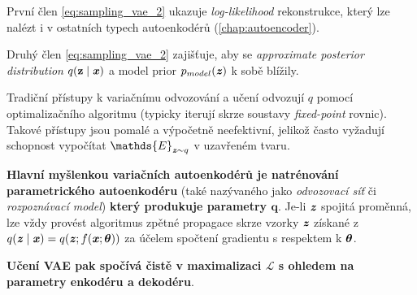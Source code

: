 První člen \autoref{eq:sampling_vae_2} ukazuje \emph{log-likelihood} rekonstrukce, který lze nalézt i v ostatních typech autoenkodérů (\autoref{chap:autoencoder}). 

Druhý člen \autoref{eq:sampling_vae_2} zajišťuje, aby se \emph{approximate posterior distribution} $q(\textbf{z}\mid\textbf{\emph{x}})$ a model prior $p_{model}(\textbf{\emph{z}})$ k sobě blížily. \cite{Goodfellow2016}

Tradiční přístupy k variačnímu odvozování a učení odvozují $q$ pomocí optimalizačního algoritmu (typicky iterují skrze soustavy \emph{fixed-point} rovnic).
Takové přístupy jsou pomalé a výpočetně neefektivní, jelikož často vyžadují schopnost vypočítat $\mathds{E}_{\textbf{\emph{z}} \sim q}$ v uzavřeném tvaru. 

\textbf{Hlavní myšlenkou variačních autoenkodérů je natrénování parametrického autoenkodéru} (také nazývaného jako \emph{odvozovací síť} či \emph{rozpoznávací model}) \textbf{který produkuje parametry $\textbf{q}$}.
Je-li $\textbf{\emph{z}}$ spojitá proměnná, lze vždy provést algoritmus zpětné propagace skrze vzorky $\textbf{\emph{z}}$ získané z $q(\textbf{\emph{z}}\mid\textbf{\emph{x}}) = q(\textbf{\emph{z}};f(\textbf{\emph{x}}; \bm{\emph{$\theta$}}))$ za účelem spočtení gradientu s respektem k $\bm{\emph{$\theta$}}$. \cite{Goodfellow2016}

\textbf{Učení VAE pak spočívá čistě v maximalizaci $\mathcal{L}$ s ohledem na parametry enkodéru a dekodéru}. \cite{Kingma2014}